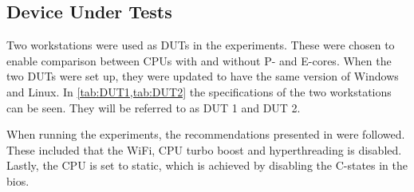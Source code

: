 \subsection{Device Under Tests}
Two workstations were used as DUTs in the experiments. These were chosen to enable comparison between CPUs with and without P- and E-cores. When the two DUTs were set up, they were updated to have the same version of Windows and Linux. In \cref {tab:DUT1,tab:DUT2} the specifications of the two workstations can be seen. They will be referred to as DUT 1 and DUT 2. 




When running the experiments, the recommendations presented in \cite{Lindholt2022} were followed. These included that the WiFi, CPU turbo boost and hyperthreading is disabled. Lastly, the CPU is set to static, which is achieved by disabling the C-states in the bios.